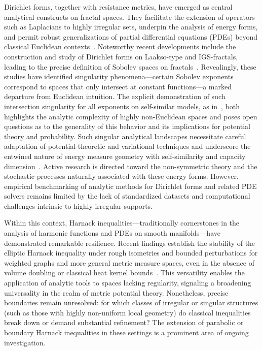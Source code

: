 \documentclass[sigconf]{acmart}
\begin{document}
Dirichlet forms, together with resistance metrics, have emerged as central analytical constructs on fractal spaces. They facilitate the extension of operators such as Laplacians to highly irregular sets, underpin the analysis of energy forms, and permit robust generalizations of partial differential equations (PDEs) beyond classical Euclidean contexts~\cite{ref43,ref51,ref40}. Noteworthy recent developments include the construction and study of Dirichlet forms on Laakso-type and IGS-fractals, leading to the precise definition of Sobolev spaces on fractals~\cite{ref13}. Revealingly, these studies have identified singularity phenomena---certain Sobolev exponents correspond to spaces that only intersect at constant functions---a marked departure from Euclidean intuition. The explicit demonstration of such intersection singularity for all exponents on self-similar models, as in~\cite{ref13}, both highlights the analytic complexity of highly non-Euclidean spaces and poses open questions as to the generality of this behavior and its implications for potential theory and probability. Such singular analytical landscapes necessitate careful adaptation of potential-theoretic and variational techniques and underscore the entwined nature of energy measure geometry with self-similarity and capacity dimension~\cite{ref43,ref40}. Active research is directed toward the non-symmetric theory and the stochastic processes naturally associated with these energy forms. However, empirical benchmarking of analytic methods for Dirichlet forms and related PDE solvers remains limited by the lack of standardized datasets and computational challenges intrinsic to highly irregular supports.

Within this context, Harnack inequalities---traditionally cornerstones in the analysis of harmonic functions and PDEs on smooth manifolds---have demonstrated remarkable resilience. Recent findings establish the stability of the elliptic Harnack inequality under rough isometries and bounded perturbations for weighted graphs and more general metric measure spaces, even in the absence of volume doubling or classical heat kernel bounds~\cite{ref38,ref40}. This versatility enables the application of analytic tools to spaces lacking regularity, signaling a broadening universality in the realm of metric potential theory. Nonetheless, precise boundaries remain unresolved: for which classes of irregular or singular structures (such as those with highly non-uniform local geometry) do classical inequalities break down or demand substantial refinement? The extension of parabolic or boundary Harnack inequalities in these settings is a prominent area of ongoing investigation.
\end{document}
